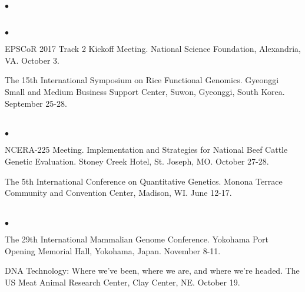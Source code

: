 \documentclass[margin,line,10pt]{res}
\newenvironment{list2}{
  \begin{list}{$\bullet$}{%
      \setlength{\itemsep}{0in}
      \setlength{\parsep}{0in} \setlength{\parskip}{0in}
      \setlength{\topsep}{0in} \setlength{\partopsep}{0in} 
      \setlength{\leftmargin}{0.2in}}}{\end{list}}
\begin{document}
\begin{resume}
\begin{list2}
\end{list2}


\section{}
\begin{list2}

\item EPSCoR 2017 Track 2 Kickoff Meeting.  National Science Foundation, Alexandria, VA. October 3.
  
  \vspace{0.5cm}

\item The 15th International Symposium on Rice Functional Genomics. Gyeonggi Small and Medium Business Support Center, Suwon, Gyeonggi, South Korea. September 25-28.

  
  \end{list2}  


\section{}
\begin{list2}

\item NCERA-225 Meeting. Implementation and Strategies for National Beef Cattle Genetic Evaluation. Stoney Creek Hotel, St. Joseph, MO. October 27-28. 

  \vspace{0.5cm}
  
\item The 5th International Conference on Quantitative Genetics. Monona Terrace Community and Convention Center, Madison, WI. June 12-17. 

\end{list2}  




\section{}
\begin{list2}
  
\item The 29th International Mammalian Genome Conference. Yokohama Port Opening Memorial Hall, Yokohama, Japan. November 8-11. 

  \vspace{0.5cm}
  
  \item DNA Technology: Where we've been, where we are, and where we're headed. The US Meat Animal Research Center, Clay Center, NE. October 19. 
  

\end{list2}
\end{resume}
\end{document}
